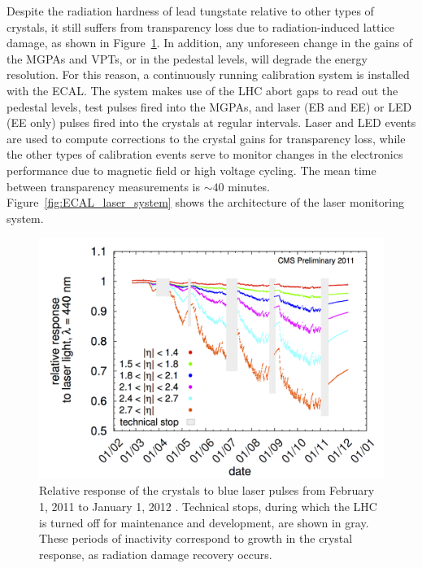 \documentclass[dissertation.tex]{subfiles}
\begin{document}
Despite the radiation hardness of lead tungstate relative to other types of crystals, it still suffers from transparency loss due to radiation-induced lattice damage, as shown in Figure~\ref{fig:ECAL_rad_damage}.  In addition, any unforeseen change in the gains of the MGPAs and VPTs, or in the pedestal levels, will degrade the energy resolution.  For this reason, a continuously running calibration system is installed with the ECAL.  The system makes use of the LHC abort gaps to read out the pedestal levels, test pulses fired into the MGPAs, and laser (EB and EE) or LED (EE only) pulses fired into the crystals at regular intervals.  Laser and LED events are used to compute corrections to the crystal gains for transparency loss, while the other types of calibration events serve to monitor changes in the electronics performance due to magnetic field or high voltage cycling.  The mean time between transparency measurements is $\sim40$ minutes.  Figure~\ref{fig:ECAL_laser_system} shows the architecture of the laser monitoring system.

\begin{figure}
	\centering
	\includegraphics[scale=1.0]{ECAL_rad_damage}
	\caption{Relative response of the crystals to blue laser pulses from February 1, 2011 to January 1, 2012 \cite{ECAL_DPG_Twiki_rad_damage}.  Technical stops, during which the LHC is turned off for maintenance and development, are shown in gray.  These periods of inactivity correspond to growth in the crystal response, as radiation damage recovery occurs.}
	\label{fig:ECAL_rad_damage}
\end{figure}
\end{document}
